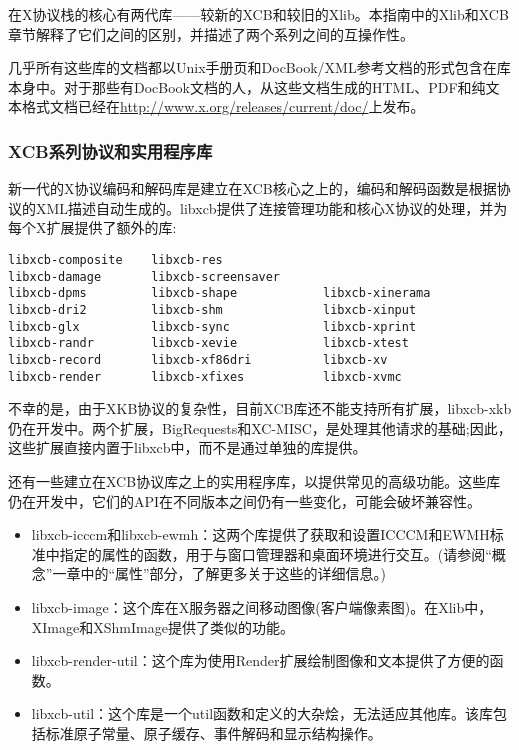 在X协议栈的核心有两代库——较新的XCB和较旧的Xlib。本指南中的Xlib和XCB章节解释了它们之间的区别，并描述了两个系列之间的互操作性。

几乎所有这些库的文档都以Unix手册页和DocBook/XML参考文档的形式包含在库本身中。对于那些有DocBook文档的人，从这些文档生成的HTML、PDF和纯文本格式文档已经在\url{http://www.x.org/releases/current/doc/}上发布。

\subsubsection{XCB系列协议和实用程序库}

新一代的X协议编码和解码库是建立在XCB核心之上的，编码和解码函数是根据协议的XML描述自动生成的。libxcb提供了连接管理功能和核心X协议的处理，并为每个X扩展提供了额外的库:

\begin{lstlisting}
libxcb-composite    libxcb-res        
libxcb-damage       libxcb-screensaver 
libxcb-dpms         libxcb-shape            libxcb-xinerama
libxcb-dri2         libxcb-shm              libxcb-xinput
libxcb-glx          libxcb-sync         	libxcb-xprint
libxcb-randr        libxcb-xevie            libxcb-xtest
libxcb-record       libxcb-xf86dri      	libxcb-xv
libxcb-render       libxcb-xfixes       	libxcb-xvmc
\end{lstlisting}
\vspace{-3em}

不幸的是，由于XKB协议的复杂性，目前XCB库还不能支持所有扩展，libxcb-xkb仍在开发中。两个扩展，BigRequests和XC-MISC，是处理其他请求的基础;因此，这些扩展直接内置于libxcb中，而不是通过单独的库提供。

还有一些建立在XCB协议库之上的实用程序库，以提供常见的高级功能。这些库仍在开发中，它们的API在不同版本之间仍有一些变化，可能会破坏兼容性。

\vspace{-5mm}

\begin{itemize}
	\item libxcb-icccm和libxcb-ewmh：这两个库提供了获取和设置ICCCM和EWMH标准中指定的属性的函数，用于与窗口管理器和桌面环境进行交互。(请参阅“概念”一章中的“属性”部分，了解更多关于这些的详细信息。)
	\item libxcb-image：这个库在X服务器之间移动图像(客户端像素图)。在Xlib中，XImage和XShmImage提供了类似的功能。
	\item libxcb-render-util：这个库为使用Render扩展绘制图像和文本提供了方便的函数。
	\item libxcb-util：这个库是一个util函数和定义的大杂烩，无法适应其他库。该库包括标准原子常量、原子缓存、事件解码和显示结构操作。
\end{itemize}

